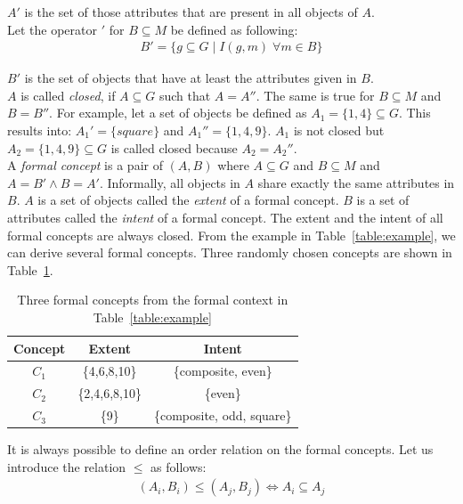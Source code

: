 \documentclass[11pt]{report}
\begin{document}
$A'$ is the set of those attributes that are present in all objects of $A$. \\

Let the operator $'$ for $B \subseteq M$ be defined as following:
\begin{align*}
	B' = \{ g \subseteq G\; |\;  I(g, m)\;   \forall m \in B\}
\end{align*}

$B'$ is the set of objects that have at least the attributes given in $B$. \\

$A$ is called \textit{closed}, if $A \subseteq G$ such that $A = A''$. The same is true for $B \subseteq M$ and $B = B''$. For example, let a set of objects be defined as $A_1 = \{1,4\} \subseteq G$. This results into: $A_1' = \{square\}$ and $A_1'' = \{1,4,9\}$. $A_1$ is not closed but $A_2 = \{1,4,9\} \subseteq G$ is called closed because $A_2 = A_2''$. \\   

A \textit{formal concept} is a pair of $(A, B)$ where $A \subseteq G$ and $B \subseteq M$ and $A = B' \wedge B = A' $. Informally, all objects in $A$ share exactly the same attributes in $B$. $A$ is a set of objects called the \textit{extent} of a formal concept. $B$ is a set of attributes called the \textit{intent} of a formal concept. The extent and the intent of all formal concepts are always closed. From the example in Table~\ref{table:example}, we can derive several formal concepts. Three randomly chosen concepts are shown in Table~\ref{table:exampleConcepts}. \\

\begin{table}[h]
\caption{Three formal concepts from the formal context in Table~\ref{table:example}}
\label{table:exampleConcepts}
\centering

\def\arraystretch{1.2}%
\begin{tabular}{ c c c }
\hline
 Concept & Extent & Intent \\
\hline

$C_1$ & \{4,6,8,10\} & \{composite, even\} \\
$C_2$ & \{2,4,6,8,10\} & \{even\} \\
$C_3$ & \{9\} & \{composite, odd, square\} \\

\hline
\end{tabular}
\end{table}

It is always possible to define an order relation on the formal concepts. Let us introduce the relation $\le$ as follows:
\begin{align*} (A_i,B_i) \le (A_j, B_j) \Longleftrightarrow	A_i \subseteq A_j
\end{align*}
\end{document}
